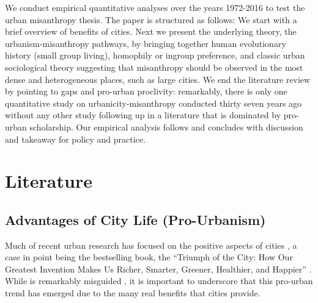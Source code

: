 \documentclass[11pt, letterpaper]{article}
\begin{document}
\begin{spacing}{1.4}
We conduct empirical quantitative analyses over the years 1972-2016 to test the
urban misanthropy thesis. The paper is structured as follows: We start with a
brief overview of benefits of cities. Next we present the underlying theory, the urbanism-misanthropy pathways, by
bringing together human evolutionary history (small group living), homophily or ingroup preference, and classic urban sociological theory suggesting that
misanthropy should be observed in the most dense and heterogeneous places, such as large cities.
 We end the literature review by pointing to gaps and pro-urban proclivity:
remarkably, there is only one quantitative study on urbanicity-misanthropy conducted thirty seven years ago without any other study following up in a literature that is dominated by pro-urban scholarship. %
 Our
empirical analysis follows and concludes with discussion and %
 takeaway for policy and practice.

   

\section*{Literature}

\subsection*{Advantages of City Life (Pro-Urbanism)}    
    
Much of recent urban research has focused on the positive aspects
of cities \citep{thrift05,amin06,aokCityBook15,peck16}, a case in point being the bestselling book, the ``Triumph of the
City: How Our Greatest Invention Makes Us Richer, Smarter, Greener, Healthier,
and Happier'' \citep{glaeser11}. While \citet{glaeser11} is remarkably misguided
\citep{aokCityBook15,peck16}, it is important to underscore that this pro-urban
trend has emerged due to the many real benefits that cities provide. 


\end{spacing}
\end{document}

